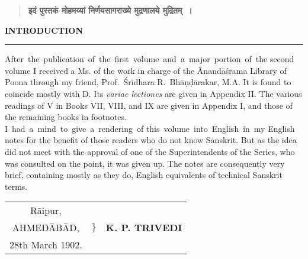 \documentclass[11pt, openany]{book}
\begin{document}
\newpage
\thispagestyle{empty}

\vspace*{3.4in}
\begin{quote}

\centerline{
\textbf{इदं पुस्तकं मोहमय्यां निर्णयसागराख्ये मुद्रणालये मुद्रितम्~। }}
\end{quote}

\newpage
\thispagestyle{empty}
\begin{center}
\textbf{INTRODUCTION}
\vspace{1mm}

\rule{1in}{0.5pt}
\end{center}
\vspace{3mm}

 {\en After \,the \,publication \,of \,the \,first \,volume \,and \,a \,major \,portion \,of \,the second volume I received a Ms. of the work in charge  of the Ānandāśrama Library of Poona through my friend,  Prof.~Śrīdhara R.~Bhāṇḍārakar, M.A. It is found to coincide mostly with D. Its \textit{variae lectiones} are given in Appendix II. The various readings of V in Books VII, VIII, and IX are 
given in Appendix I, and those of the remaining books in footnotes. \\

 I \,had \,a \,mind \,to \,give \,a \,rendering \,of this \,volume \,into \,English \,in \,my English notes for the benefit of those readers who do not know Sanskrit. But as the idea did not meet with the approval of one of the Superintendents of the Series, who was consulted on the point, it was given up. The notes are consequently very brief, containing mostly as they do, English equivalents of technical Sanskrit terms. \\

\begin{tabular}{ccc}
Rāipur, & \multirow{3}{*}{$\Bigg \}$}&\\
AHMEDĀBĀD, & &  \hspace{1.5in} \textbf{K. P. TRIVEDI }\\
28th March 1902.& & \\
\end{tabular}}

 

\newpage
\setcounter{page}{1}
\renewcommand{\thepage}{\roman{page}}
\end{document}
